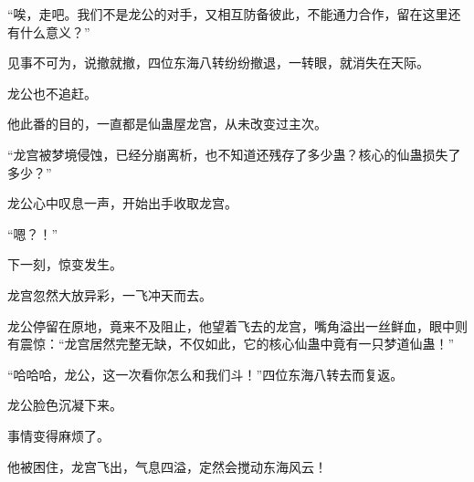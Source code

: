 \begin{this_body}
“唉，走吧。我们不是龙公的对手，又相互防备彼此，不能通力合作，留在这里还有什么意义？”

见事不可为，说撤就撤，四位东海八转纷纷撤退，一转眼，就消失在天际。

龙公也不追赶。

他此番的目的，一直都是仙蛊屋龙宫，从未改变过主次。

“龙宫被梦境侵蚀，已经分崩离析，也不知道还残存了多少蛊？核心的仙蛊损失了多少？”

龙公心中叹息一声，开始出手收取龙宫。

“嗯？！”

下一刻，惊变发生。

龙宫忽然大放异彩，一飞冲天而去。

龙公停留在原地，竟来不及阻止，他望着飞去的龙宫，嘴角溢出一丝鲜血，眼中则有震惊：“龙宫居然完整无缺，不仅如此，它的核心仙蛊中竟有一只梦道仙蛊！”

“哈哈哈，龙公，这一次看你怎么和我们斗！”四位东海八转去而复返。

龙公脸色沉凝下来。

事情变得麻烦了。

他被困住，龙宫飞出，气息四溢，定然会搅动东海风云！

\end{this_body}


